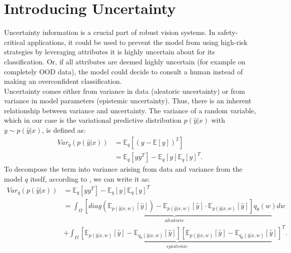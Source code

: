 \documentclass[a4paper,cleardoubleempty,BCOR1cm, 11pt]{report}
\begin{document}
\section{Introducing Uncertainty}
Uncertainty information is a crucial part of robust vision systems. In safety-critical applications, it could be used to prevent the model from using high-risk strategies by leveraging attributes it is highly uncertain about for its classification. Or, if all attributes are deemed highly uncertain (for example on completely OOD data), the model could decide to consult a human instead of making an overconfident classification.\\
Uncertainty comes either from variance in data (aleatoric uncertainty) or from variance in model parameters (epistemic uncertainty). Thus, there is an inherent relationship between variance and uncertainty.
The variance of a random variable, which in our case is the variational predictive distribution $p(\hat{y} | x)$ with $y\sim p(\hat{y} | x)$, is defined as:
\begin{align}
	Var_q(p(\hat{y} | x)) &= \mathbb{E}_q \left[ (y-\mathbb{E}\left[ y\right])^2 \right]\\
	&= \mathbb{E}_q \left[yy^T\right]  - \mathbb{E}_q\left[y\right]\mathbb{E}_q\left[y\right]^T.
\end{align}
To decompose the term into variance arising from data and variance from the model $q$ itself, according to \citet{kwon2020uncertainty}, we can write it as:
\begin{align}
Var_q(p(\hat{y} | x)) &= \mathbb{E}_q \left[yy^T\right]  - \mathbb{E}_q\left[y\right]\mathbb{E}_q\left[y\right]^T\\
	&\underbrace{=\int_{\Omega}\left[ diag (\mathbb{E}_{p(\hat{y}|x,w)}[\hat{y}]) -\mathbb{E}_{p(\hat{y}|x,w)}[\hat{y}] \cdot \mathbb{E}_{p(\hat{y}|x,w)}[\hat{y}] \right]q_{\theta}(w)dw}_{aleatoric}\\
	&+\underbrace{\int_{\Omega}\left[ \mathbb{E}_{p(\hat{y}|x,w)}[\hat{y}] - \mathbb{E}_{q_{\theta}(\hat{y}|x,w)}[\hat{y}] \right] \left[ \mathbb{E}_{p(\hat{y}|x,w)}[\hat{y}] - \mathbb{E}_{q_{\theta}(\hat{y}|x,w)}[\hat{y}] \right]^T}_{epistemic}.
\end{align}
\end{document}
